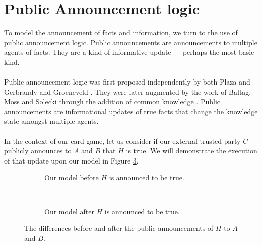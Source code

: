 \documentclass[12pt, a4paper, titlepage]{scrartcl}
\begin{document}
\section{Public Announcement logic}\label{pal}
To model the announcement of facts and information, we turn to the use of public
announcement logic.
Public announcements are announcements to multiple agents of facts.
They are a kind of informative update --- perhaps the most basic kind.\\
\\
Public announcement logic was first proposed independently by both Plaza and
Gerbrandy and Groeneveld \cite{plaza2007public,gelbrandy1997reasoning}.
They were later augmented by the work of Baltag, Moss and Solecki through the
addition of common knowledge \cite{baltag1998lpa}.
Public announcements are informational updates of true facts that change the
knowledge state amongst multiple agents.\\
\\
In the context of our card game, let us consider if our external trusted party
$C$ publicly announces to $A$ and $B$ that $H$ is true.
We will demonstrate the execution of that update upon our model in Figure
\ref{pakripkefigure}.
\begin{figure}[ht!]
\centering
\begin{subfigure}[b]{.45\textwidth}
\centering
{}
\caption{Our model before $H$ is announced to be true.}
\label{beforefigure}
\end{subfigure}
~
\begin{subfigure}[b]{.45\textwidth}
\centering
{}
\caption{Our model after $H$ is announced to be true.}
\label{afterfigure}
\end{subfigure}
\caption{The differences before and after the public announcements of $H$ to $A$ and
	$B$.}
\label{pakripkefigure}
\end{figure}
\end{document}
